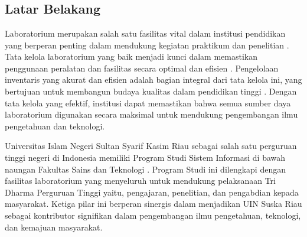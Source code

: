 %
%
%
%

\chapter{\babSatu}

\section{Latar Belakang}
Laboratorium merupakan salah satu fasilitas vital dalam institusi pendidikan yang berperan penting dalam mendukung kegiatan praktikum dan penelitian \cite{la2021comparison}. Tata kelola laboratorium yang baik menjadi kunci dalam memastikan penggunaan peralatan dan fasilitas secara optimal dan efisien \cite{jeffrey_s__warren_2017}. Pengelolaan inventaris yang akurat dan efisien adalah bagian integral dari tata kelola ini, yang bertujuan untuk membangun budaya kualitas dalam pendidikan tinggi \cite{abrantes2020governance}. Dengan tata kelola yang efektif, institusi dapat memastikan bahwa semua sumber daya laboratorium digunakan secara maksimal untuk mendukung pengembangan ilmu pengetahuan dan teknologi.

Universitas Islam Negeri Sultan Syarif Kasim Riau sebagai salah satu perguruan tinggi negeri di Indonesia memiliki Program Studi Sistem Informasi di bawah naungan Fakultas Sains dan Teknologi \cite{uin-suska-website}. Program Studi ini dilengkapi dengan fasilitas laboratorium yang menyeluruh untuk mendukung pelaksanaan Tri Dharma Perguruan Tinggi yaitu, pengajaran, penelitian, dan pengabdian kepada masyarakat. Ketiga pilar ini berperan sinergis dalam menjadikan UIN Suska Riau sebagai kontributor signifikan dalam pengembangan ilmu pengetahuan, teknologi, dan kemajuan masyarakat.


